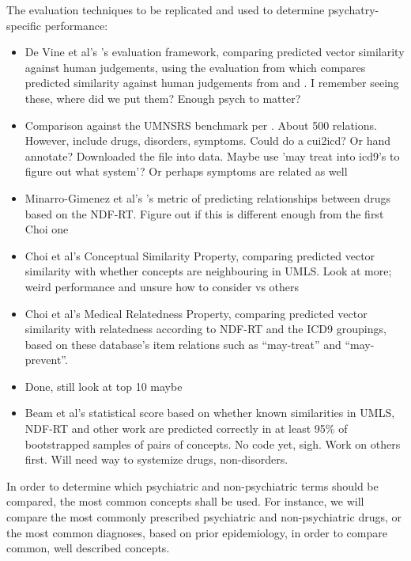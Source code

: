 \documentclass[10pt]{article}
\begin{document}
The evaluation techniques to be replicated and used to determine psychatry-specific performance:
\begin{itemize}
	\item De Vine et al's 's evaluation framework, comparing predicted vector similarity against human judgements, using the evaluation from \cite{koopmanEvaluationCorpusdrivenMeasures2012} which compares predicted similarity against human judgements from \cite{pedersenMeasuresSemanticSimilarity2007} and \cite{caviedesDevelopmentConceptualDistance2004}.
	\subitem I remember seeing these, where did we put them? Enough psych to matter?
	\item Comparison against the UMNSRS benchmark per \cite{yuRetrofittingConceptVector2017}.
	\subitem About 500 relations. However, include drugs, disorders, symptoms. Could do a cui2icd? Or hand annotate? Downloaded the file into data. Maybe use 'may treat into icd9's to figure out what system'? Or perhaps symptoms are related as well
	\item Minarro-Gimenez et al's 's metric of predicting relationships between drugs based on the NDF-RT. 
	\subitem Figure out if this is different enough from the first Choi one 
	\item Choi et al's  Conceptual Similarity Property, comparing predicted vector similarity with whether concepts are neighbouring in UMLS. 
	\subitem Look at more; weird performance and unsure how to consider vs others
	\item Choi et al's  Medical Relatedness Property, comparing predicted vector similarity with relatedness according to NDF-RT and the ICD9 groupings, based on these database's item relations such as ``may-treat'' and ``may-prevent''. 
	\item Done, still look at top 10 maybe
	\item Beam et al's  statistical score based on whether known similarities in UMLS, NDF-RT and other work are predicted correctly in at least 95\% of bootstrapped samples of pairs of concepts. 
	\subitem No code yet, sigh. Work on others first. Will need way to systemize drugs, non-disorders.
\end{itemize}

In order to determine which psychiatric and non-psychiatric terms should be compared, the most common concepts shall be used. For instance, we will compare the most commonly prescribed psychiatric and non-psychiatric drugs, or the most common diagnoses, based on prior epidemiology, in order to compare common, well described concepts.
\end{document}
